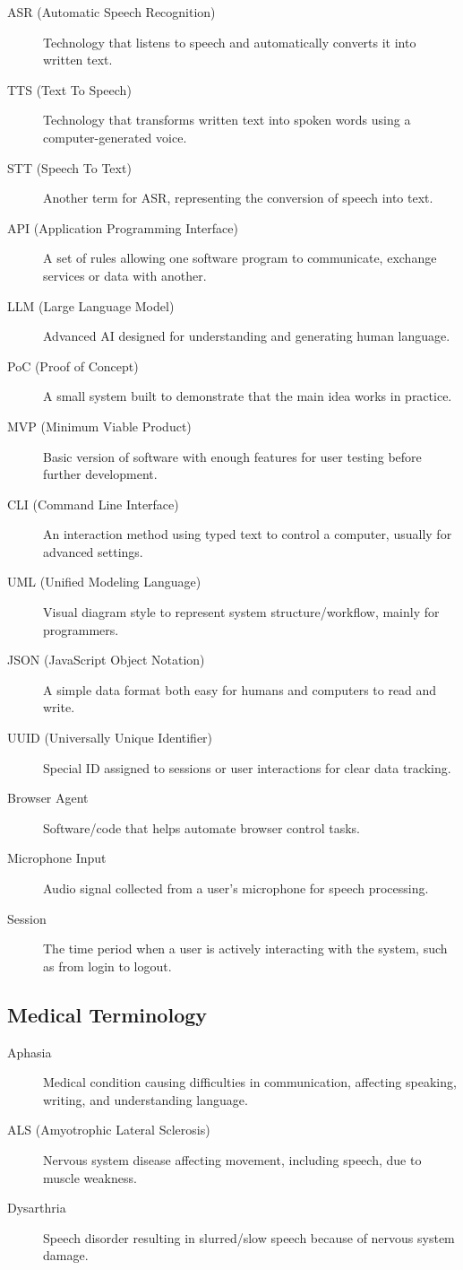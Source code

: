 \documentclass[11pt]{article}
\begin{document}
\begin{description}
  \item[ASR (Automatic Speech Recognition)] Technology that listens to speech and automatically converts it into written text.
  \item[TTS (Text To Speech)] Technology that transforms written text into spoken words using a computer-generated voice.
  \item[STT (Speech To Text)] Another term for ASR, representing the conversion of speech into text.
  \item[API (Application Programming Interface)] A set of rules allowing one software program to communicate, exchange services or data with another.
  \item[LLM (Large Language Model)] Advanced AI designed for understanding and generating human language.
  \item[PoC (Proof of Concept)] A small system built to demonstrate that the main idea works in practice.
  \item[MVP (Minimum Viable Product)] Basic version of software with enough features for user testing before further development.
  \item[CLI (Command Line Interface)] An interaction method using typed text to control a computer, usually for advanced settings.
  \item[UML (Unified Modeling Language)] Visual diagram style to represent system structure/workflow, mainly for programmers.
  \item[JSON (JavaScript Object Notation)] A simple data format both easy for humans and computers to read and write.
  \item[UUID (Universally Unique Identifier)] Special ID assigned to sessions or user interactions for clear data tracking.
  \item[Browser Agent] Software/code that helps automate browser control tasks.
  \item[Microphone Input] Audio signal collected from a user’s microphone for speech processing.
  \item[Session] The time period when a user is actively interacting with the system, such as from login to logout.
\end{description}

\subsection*{Medical Terminology}

\begin{description}
  \item[Aphasia] Medical condition causing difficulties in communication, affecting speaking, writing, and understanding language.
  \item[ALS (Amyotrophic Lateral Sclerosis)] Nervous system disease affecting movement, including speech, due to muscle weakness.
  \item[Dysarthria] Speech disorder resulting in slurred/slow speech because of nervous system damage.
\end{description}
\end{document}

